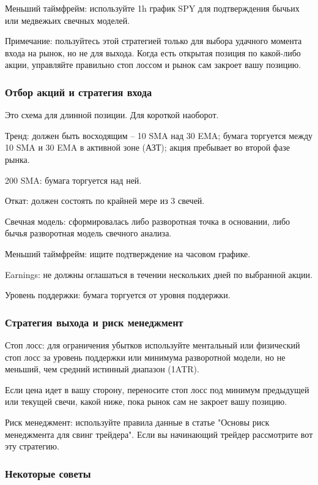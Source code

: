 \documentclass[a5paper]{article}
\begin{document}
Меньший таймфрейм: используйте 1h график SPY для подтверждения бычьих или медвежьих свечных моделей.

Примечание: пользуйтесь этой стратегией только для выбора удачного
момента входа на рынок, но не для выхода. Когда есть открытая позиция
по какой-либо акции, управляйте правильно стоп лоссом и рынок сам
закроет вашу позицию.

\subsubsection{Отбор акций и стратегия входа}

Это схема для длинной позиции. Для короткой наоборот.

Тренд: должен быть восходящим – 10 SMA над 30 EMA; бумага торгуется между 10 SMA и 30 EMA в активной зоне (АЗТ); акция пребывает во второй фазе рынка.

200 SMA: бумага торгуется над ней.

Откат: должен состоять по крайней мере из 3 свечей.

Свечная модель: сформировалась либо разворотная точка в основании, либо бычья разворотная модель свечного анализа.

Меньший таймфрейм: ищите подтверждение на часовом графике.

Earnings: не должны оглашаться в течении нескольких дней по выбранной акции.

Уровень поддержки: бумага торгуется от уровня поддержки.

\subsubsection{Стратегия выхода и риск менеджмент}

Стоп лосс: для ограничения убытков используйте ментальный или физический стоп лосс за уровень поддержки или минимума разворотной модели, но не меньший, чем средний истинный диапазон (1ATR).

Если цена идет в вашу сторону, переносите стоп лосс под минимум предыдущей или текущей свечи, какой ниже, пока рынок сам не закроет вашу позицию.

Риск менеджмент: используйте правила данные в статье "Основы риск
менеджмента для свинг трейдера". Если вы начинающий трейдер
рассмотрите вот эту стратегию.

\subsubsection{Некоторые советы}
\end{document}

